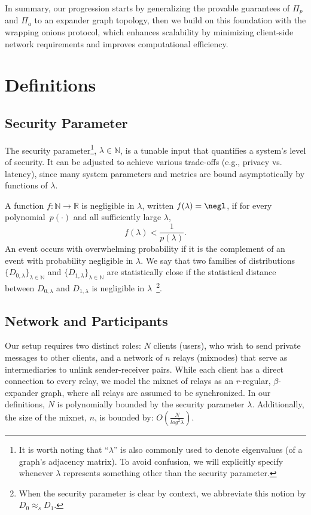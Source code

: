 In summary, our progression starts by generalizing the provable guarantees of $\Pi_p$ and $\Pi_a$ to an expander graph topology, then we build on this foundation with the wrapping onions protocol, which enhances scalability by minimizing client-side network requirements and improves computational efficiency.


\section{Definitions}

\subsection{Security Parameter}

The security parameter\footnote{It is worth noting that ``$\lambda$'' is also commonly used to denote eigenvalues (of a graph's adjacency matrix). To avoid confusion, we will explicitly specify whenever $\lambda$ represents something other than the security parameter.}, $\lambda \in \mathbb{N}$, is a tunable input that quantifies a system's level of security. It can be adjusted to achieve various trade-offs (e.g., privacy vs. latency), since many system parameters and metrics are bound asymptotically by functions of $\lambda$. 

A function $f : \mathbb{N} \rightarrow \mathbb{R}$ is negligible in $\lambda$, written $f(\lambda) = \negl$, if for every polynomial~$p(\cdot)$ and all sufficiently large $\lambda$, 
$$
f(\lambda) < \frac{1}{p(\lambda)}.
$$
An event occurs with overwhelming probability if it is the complement of an event with probability negligible in $\lambda$. We say that two families of distributions~$\{D_{0, \lambda}\}_{\lambda \in\mathbb{N}}$ and $\{D_{1, \lambda}\}_{\lambda \in\mathbb{N}}$ are statistically close if the statistical distance between $D_{0, \lambda}$ and $D_{1, \lambda}$ is negligible in $\lambda$~\footnote{When the security parameter is clear by context, we abbreviate this notion by $D_0 \approx_s D_1$.}.

\subsection{Network and Participants}

Our setup requires two distinct roles: $N$ clients (users), who wish to send private messages to other clients, and a network of $n$ relays (mixnodes) that serve as intermediaries to unlink sender-receiver pairs. While each client has a direct connection to every relay, we model the mixnet of relays as an $r$-regular, $\beta$-expander graph, where all relays are assumed to be synchronized. In our definitions, $N$ is polynomially bounded by the security parameter $\lambda$. Additionally, the size of the mixnet, $n$, is bounded by: $O\left(\frac{N}{log^2 \lambda}\right)$. 

